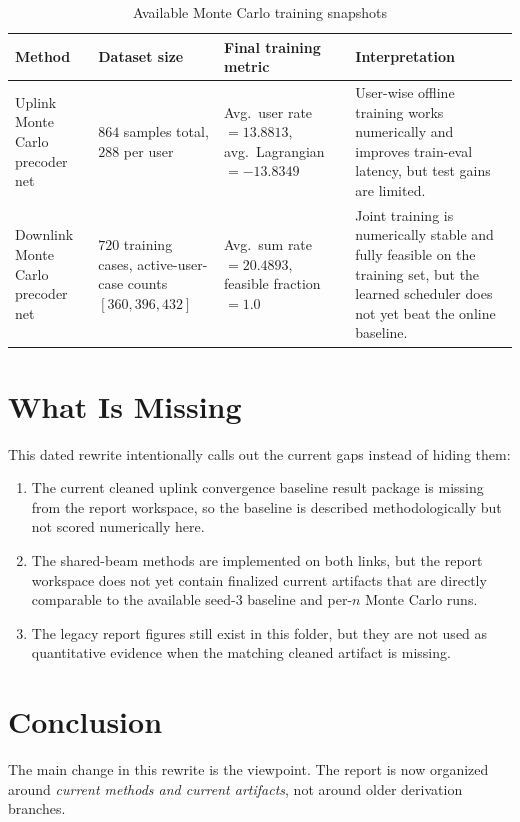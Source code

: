 \documentclass[11pt]{article}
\begin{document}
\begin{table}[ht]
\centering
\small
\caption{Available Monte Carlo training snapshots}
\renewcommand{\arraystretch}{1.15}
\begin{tabularx}{\textwidth}{>{\raggedright\arraybackslash}p{} >{\centering\arraybackslash}p{} >{\centering\arraybackslash}p{} X}
\toprule
Method & Dataset size & Final training metric & Interpretation \\
\midrule
Uplink Monte Carlo precoder net & \(864\) samples total, \(288\) per user & Avg.\ user rate \(= 13.8813\), avg.\ Lagrangian \(= -13.8349\) & User-wise offline training works numerically and improves train-eval latency, but test gains are limited. \\
Downlink Monte Carlo precoder net & \(720\) training cases, active-user-case counts \([360,396,432]\) & Avg.\ sum rate \(= 20.4893\), feasible fraction \(= 1.0\) & Joint training is numerically stable and fully feasible on the training set, but the learned scheduler does not yet beat the online baseline. \\
\bottomrule
\end{tabularx}
\end{table}

\section{What Is Missing}
This dated rewrite intentionally calls out the current gaps instead of hiding them:
\begin{enumerate}[leftmargin=1.5em]
    \item The current cleaned uplink convergence baseline result package is missing from the report workspace, so the baseline is described methodologically but not scored numerically here.
    \item The shared-beam methods are implemented on both links, but the report workspace does not yet contain finalized current artifacts that are directly comparable to the available seed-3 baseline and per-\(n\) Monte Carlo runs.
    \item The legacy report figures still exist in this folder, but they are not used as quantitative evidence when the matching cleaned artifact is missing.
\end{enumerate}

\section{Conclusion}
The main change in this rewrite is the viewpoint. The report is now organized around \emph{current methods and current artifacts}, not around older derivation branches.
\end{document}
